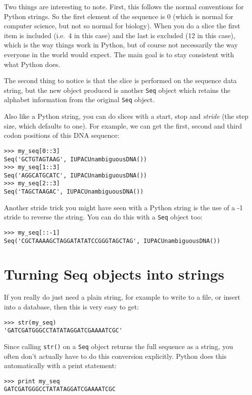 \documentclass{report}
\begin{document}
Two things are interesting to note. First, this follows the normal conventions for Python strings.  So the first element of the sequence is 0 (which is normal for computer science, but not so normal for biology). When you do a slice the first item is included (i.e.~4 in this case) and the last is excluded (12 in this case), which is the way things work in Python, but of course not necessarily the way everyone in the world would expect. The main goal is to stay consistent with what Python does.

The second thing to notice is that the slice is performed on the sequence data string, but the new object produced is another \verb|Seq| object which retains the alphabet information from the original \verb|Seq| object.

Also like a Python string, you can do slices with a start, stop and \emph{stride} (the step size, which defaults to one).  For example, we can get the first, second and third codon positions of this DNA sequence:

\begin{verbatim}
>>> my_seq[0::3]
Seq('GCTGTAGTAAG', IUPACUnambiguousDNA())
>>> my_seq[1::3]
Seq('AGGCATGCATC', IUPACUnambiguousDNA())
>>> my_seq[2::3]
Seq('TAGCTAAGAC', IUPACUnambiguousDNA())
\end{verbatim}

Another stride trick you might have seen with a Python string is the use of a -1 stride to reverse the string.  You can do this with a \verb|Seq| object too:

\begin{verbatim}
>>> my_seq[::-1]
Seq('CGCTAAAAGCTAGGATATATCCGGGTAGCTAG', IUPACUnambiguousDNA())
\end{verbatim}

\section{Turning Seq objects into strings}
\label{sec:seq-to-string}

If you really do just need a plain string, for example to write to a file, or insert into a database, then this is very easy to get:
\begin{verbatim}
>>> str(my_seq)
'GATCGATGGGCCTATATAGGATCGAAAATCGC'
\end{verbatim}

Since calling \verb|str()| on a \verb|Seq| object returns the full sequence as a string,
you often don't actually have to do this conversion explicitly.
Python does this automatically with a print statement:
\begin{verbatim}
>>> print my_seq
GATCGATGGGCCTATATAGGATCGAAAATCGC
\end{verbatim}
\end{document}
